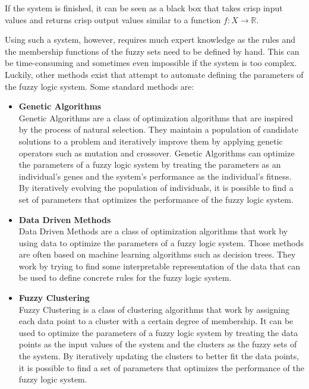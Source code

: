 If the system is finished, it can be seen as a black box that takes crisp input values and returns crisp output values similar to a function $f: X \rightarrow \mathbb{R}$.


Using such a system, however, requires much expert knowledge as the rules and the membership functions of the fuzzy sets need to be defined by hand. This can be time-consuming and sometimes even impossible if the system is too complex. Luckily, other methods exist that attempt to automate defining the parameters of the fuzzy logic system. Some standard methods are:

\begin{itemize}
      \item \textbf{Genetic Algorithms} \\
            Genetic Algorithms are a class of optimization algorithms that are inspired by the process of natural selection. They maintain a population of candidate solutions to a problem and iteratively improve them by applying genetic operators such as mutation and crossover. Genetic Algorithms can optimize the parameters of a fuzzy logic system by treating the parameters as an individual's genes and the system's performance as the individual's fitness. By iteratively evolving the population of individuals, it is possible to find a set of parameters that optimizes the performance of the fuzzy logic system.

      \item \textbf{Data Driven Methods} \\
            Data Driven Methods are a class of optimization algorithms that work by using data to optimize the parameters of a fuzzy logic system. Those methods are often based on machine learning algorithms such as decision trees. They work by trying to find some interpretable representation of the data that can be used to define concrete rules for the fuzzy logic system.

      \item \textbf{Fuzzy Clustering} \\
            Fuzzy Clustering is a class of clustering algorithms that work by assigning each data point to a cluster with a certain degree of membership. It can be used to optimize the parameters of a fuzzy logic system by treating the data points as the input values of the system and the clusters as the fuzzy sets of the system. By iteratively updating the clusters to better fit the data points, it is possible to find a set of parameters that optimizes the performance of the fuzzy logic system.
\end{itemize}
